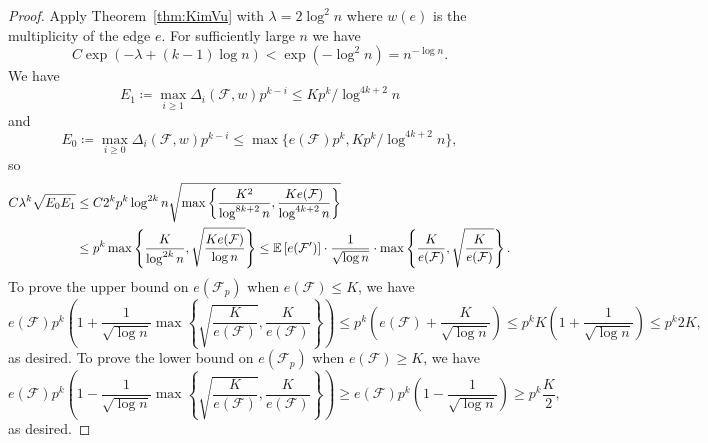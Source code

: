 \documentclass[11pt]{article}
\numberwithin{equation}{section}
\newcounter{i}
\theoremstyle{plain}
\theoremstyle{plain} %
\theoremstyle{definition}
\newcommand{\cF}{\mathcal{F}}
\newcommand{\Expect}[1]{\ensuremath{%
\mathbb E\left[#1\right]
}}
\begin{document}
\begin{proof}
    Apply Theorem~\ref{thm:KimVu} with $\lambda = 2\log^2 n$ where $w(e)$ is the multiplicity of the edge $e$.  For sufficiently large $n$ we have
    \begin{equation*}
        C\exp(-\lambda + (k - 1)\log n) < \exp(-\log^2 n) = n^{-\log n}.
    \end{equation*}
    We have
    \begin{equation*}
        E_1 \coloneqq \max_{i\geq 1}\Delta_i(\cF, w)p^{k - i} \leq Kp^k / \log^{4k + 2}n
    \end{equation*}
    and 
    \begin{equation*}
        E_0 \coloneqq \max_{i\geq0}\Delta_i(\cF, w)p^{k - i} \leq \max\{e(\cF)p^k, Kp^k / \log^{4k+2} n\},
    \end{equation*}
    so
    \begin{align*}
        C\lambda^k\sqrt{E_0E_1} &\leq C 2^k p^k\log^{2k}n\sqrt{\max\left\{\frac{K^2}{\log^{8k+2}n}, \frac{Ke(\cF)}{\log^{4k+2}n}\right\}} \\
        &\leq p^k\max\left\{\frac{K}{\log^{2k}n}, \sqrt{\frac{Ke(\cF)}{\log n}}\right\} \leq \Expect{e(\cF')}\cdot\frac{1}{\sqrt{\log n}}\cdot\max\left\{\frac{K}{e(\cF)}, \sqrt{\frac{K}{e(\cF)}}\right\}.
    \end{align*}
 To prove the upper bound on $e(\cF_p)$ when $e(\cF) \leq K$, we have 
 \begin{equation*}
     e(\cF)p^k\left(1 + \frac{1}{\sqrt{\log n}}\max\left\{\sqrt{\frac{K}{e(\cF)}}, \frac{K}{e(\cF)}\right\}\right) \leq p^k\left(e(\cF) + \frac{K}{\sqrt{\log n}}\right) \leq p^k K\left(1 + \frac{1}{\sqrt{\log n}}\right) \leq p^k 2K,
 \end{equation*} as desired.    
 To prove the lower bound on $e(\cF_p)$ when $e(\cF) \geq K$, we have 
 \begin{equation*}
     e(\cF)p^k\left(1 - \frac{1}{\sqrt{\log n}}\max\left\{\sqrt{\frac{K}{e(\cF)}}, \frac{K}{ e(\cF)}\right\}\right) \geq e(\cF)p^k\left(1 - \frac{1}{\sqrt{\log n}}\right) \geq p^k \frac{K}{2},
 \end{equation*} as desired.  
\end{proof}

\end{document}
